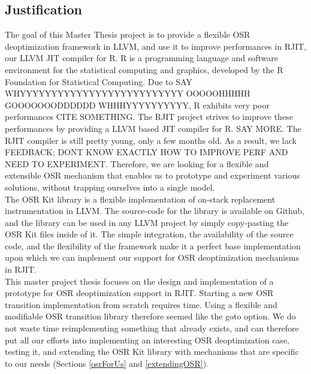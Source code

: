 \subsection{Justification}
The goal of this Master Thesis project is to provide a flexible OSR deoptimization framework in LLVM, and use it to improve performances in RJIT, our LLVM JIT compiler for R.
R is a programming language and software environment for the statistical computing and graphics, developed by the R Foundation for Statistical Computing\cite{RURL}.
Due to SAY WHYYYYYYYYYYYYYYYYYYYYYYYYYY OOOOOHHHHH GOOOOOOODDDDDD WHHHYYYYYYYYYY, R exhibits very poor performances CITE SOMETHING.
The RJIT project strives to improve these performances by providing a LLVM based JIT compiler for R. SAY MORE.
The RJIT compiler is still pretty young, only a few months old.
As a result, we lack FEEDBACK; DONT KNOW EXACTLY HOW TO IMPROVE PERF AND NEED TO EXPERIMENT.
Therefore, we are looking for a flexible and extensible OSR mechanism that enables us to prototype and experiment various solutions, without trapping ourselves into a single model.\\

The OSR Kit library\cite{OSRKit} is a flexible implementation of on-stack replacement instrumentation in LLVM.
The source-code for the library is available on Github\cite{OSRKitGit}, and the library can be used in any LLVM project by simply copy-pasting the OSR Kit files inside of it.
The simple integration, the availability of the source code, and the flexibility of the framework make it a perfect base implementation upon which we can implement our support for OSR deoptimization mechanisms in RJIT.\\

This master project thesis focuses on the design and implementation of a prototype for OSR deoptimization support in RJIT.
Starting a new OSR transition implementation from scratch requires time.
Using a flexible and modifiable OSR transition library therefore seemed like the goto option.
We do not waste time reimplementing something that already exists, and can therefore put all our efforts into implementing an interesting OSR deoptimization case, testing it, and extending the OSR Kit library with mechanisms that are specific to our needs (Sections \ref{osrForUs} and \ref{extendingOSR}).\\

